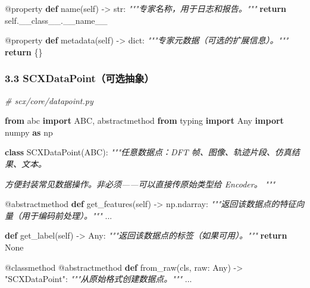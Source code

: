 \documentclass[
  12pt,
]{ctexart}
\newenvironment{Shaded}{}{}
\newcommand{\AttributeTok}[1]{\textcolor[rgb]{0.49,0.56,0.16}{#1}}
\newcommand{\BuiltInTok}[1]{\textcolor[rgb]{0.00,0.50,0.00}{#1}}
\newcommand{\CommentTok}[1]{\textcolor[rgb]{0.38,0.63,0.69}{\textit{#1}}}
\newcommand{\ControlFlowTok}[1]{\textcolor[rgb]{0.00,0.44,0.13}{\textbf{#1}}}
\newcommand{\ImportTok}[1]{\textcolor[rgb]{0.00,0.50,0.00}{\textbf{#1}}}
\newcommand{\KeywordTok}[1]{\textcolor[rgb]{0.00,0.44,0.13}{\textbf{#1}}}
\newcommand{\NormalTok}[1]{#1}
\newcommand{\OperatorTok}[1]{\textcolor[rgb]{0.40,0.40,0.40}{#1}}
\newcommand{\StringTok}[1]{\textcolor[rgb]{0.25,0.44,0.63}{#1}}
\newcommand{\VariableTok}[1]{\textcolor[rgb]{0.10,0.09,0.49}{#1}}
\begin{document}
\begin{Shaded}
\begin{Highlighting}[]
    \AttributeTok{@property}
    \KeywordTok{def}\NormalTok{ name(}\VariableTok{self}\NormalTok{) }\OperatorTok{{-}\textgreater{}} \BuiltInTok{str}\NormalTok{:}
        \CommentTok{"""专家名称，用于日志和报告。"""}
        \ControlFlowTok{return} \VariableTok{self}\NormalTok{.}\VariableTok{\_\_class\_\_}\NormalTok{.}\VariableTok{\_\_name\_\_}

    \AttributeTok{@property}
    \KeywordTok{def}\NormalTok{ metadata(}\VariableTok{self}\NormalTok{) }\OperatorTok{{-}\textgreater{}} \BuiltInTok{dict}\NormalTok{:}
        \CommentTok{"""专家元数据（可选的扩展信息）。"""}
        \ControlFlowTok{return}\NormalTok{ \{\}}
\end{Highlighting}
\end{Shaded}

\subsubsection{3.3
SCXDataPoint（可选抽象）}\label{scxdatapointux53efux9009ux62bdux8c61}

\begin{Shaded}
\begin{Highlighting}[]
\CommentTok{\# scx/core/datapoint.py}

\ImportTok{from}\NormalTok{ abc }\ImportTok{import}\NormalTok{ ABC, abstractmethod}
\ImportTok{from}\NormalTok{ typing }\ImportTok{import}\NormalTok{ Any}
\ImportTok{import}\NormalTok{ numpy }\ImportTok{as}\NormalTok{ np}


\KeywordTok{class}\NormalTok{ SCXDataPoint(ABC):}
    \CommentTok{"""任意数据点：DFT 帧、图像、轨迹片段、仿真结果、文本。}

\CommentTok{    方便封装常见数据操作。非必须——可以直接传原始类型给 Encoder。}
\CommentTok{    """}

    \AttributeTok{@abstractmethod}
    \KeywordTok{def}\NormalTok{ get\_features(}\VariableTok{self}\NormalTok{) }\OperatorTok{{-}\textgreater{}}\NormalTok{ np.ndarray:}
        \CommentTok{"""返回该数据点的特征向量（用于编码前处理）。"""}
\NormalTok{        ...}

    \KeywordTok{def}\NormalTok{ get\_label(}\VariableTok{self}\NormalTok{) }\OperatorTok{{-}\textgreater{}}\NormalTok{ Any:}
        \CommentTok{"""返回该数据点的标签（如果可用）。"""}
        \ControlFlowTok{return} \VariableTok{None}

    \AttributeTok{@classmethod}
    \AttributeTok{@abstractmethod}
    \KeywordTok{def}\NormalTok{ from\_raw(cls, raw: Any) }\OperatorTok{{-}\textgreater{}} \StringTok{"SCXDataPoint"}\NormalTok{:}
        \CommentTok{"""从原始格式创建数据点。"""}
\NormalTok{        ...}
\end{Highlighting}
\end{Shaded}
\end{document}
